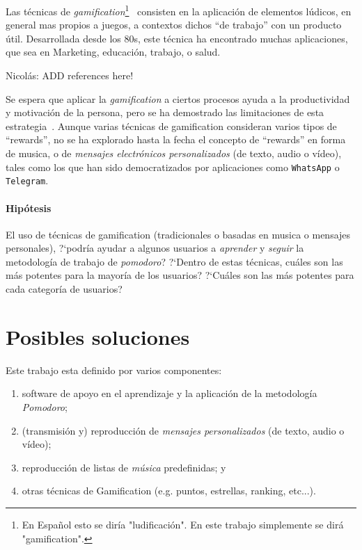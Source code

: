 \documentclass[12pt,letterpaper]{report}
\providecommand{\tightlist}{%
  \setlength{\itemsep}{0pt}\setlength{\parskip}{0pt}}
\let\oldparagraph\paragraph
\renewcommand{\paragraph}[1]{\oldparagraph{#1}\mbox{}}
\begin{document}
Las técnicas de \emph{gamification}\footnote{En Español esto se diría "ludificación". En este trabajo simplemente se dirá "gamification".}~\cite{deterding2011gamification} consisten en la aplicación de elementos lúdicos, en general mas propios a juegos, a contextos dichos ``de trabajo'' con un producto útil.  Desarrollada desde los 80s, este técnica ha encontrado muchas aplicaciones, que sea en Marketing, educación, trabajo, o salud.
\begin{TODO}
Nicolás: ADD references here!
\end{TODO}
Se espera que aplicar la \emph{gamification} a ciertos procesos ayuda a la productividad y motivación de la persona, pero se ha demostrado las limitaciones de esta estrategia~\cite{hamari2014gamification}.
%
Aunque varias técnicas de gamification consideran varios tipos de ``rewards'', no se ha explorado hasta la fecha el concepto de ``rewards'' en forma de musica, o de \emph{mensajes electrónicos personalizados} (de texto, audio o vídeo), tales como los que han sido  democratizados por aplicaciones como \texttt{WhatsApp} o \texttt{Telegram}.

\paragraph{Hipótesis}
El uso de técnicas de gamification (tradicionales o basadas en musica o mensajes personales), ?`podría ayudar a algunos usuarios a \emph{aprender} y \emph{seguir} la metodología de trabajo de \emph{pomodoro}?
?`Dentro de estas técnicas, cuáles son las más potentes para la mayoría de los usuarios?
?`Cuáles son las más potentes para cada categoría de usuarios?

\newpage
\hypertarget{posibles-soluciones}{%
\section{Posibles soluciones}\label{posibles-soluciones}}

Este trabajo esta definido por varios componentes:

\begin{enumerate}
\tightlist
\item software de apoyo en el aprendizaje y la aplicación de la metodología \emph{Pomodoro};
\item (transmisión y) reproducción de \emph{mensajes personalizados} (de texto, audio o vídeo);
\item reproducción de listas de \emph{música} predefinidas; y 
\item otras técnicas de Gamification (e.g. puntos, estrellas, ranking, etc...).
\end{enumerate}
\end{document}
